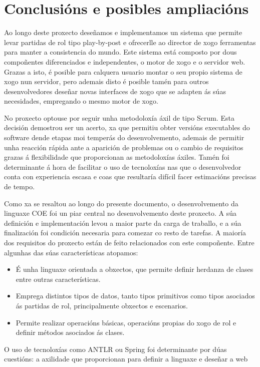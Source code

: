 \chapter{Conclusións e posibles ampliacións}
Ao longo deste proxecto deseñamos e implementamos un sistema que permite levar
partidas de rol tipo play-by-post e ofrecerlle ao director de xogo ferramentas
para manter a consistencia do mundo. Este sistema está composto por dous
compoñentes diferenciados e independentes, o motor de xogo e o servidor web.
Grazas a isto, é posible para calquera usuario montar o seu propio sistema de
xogo nun servidor, pero ademais disto é posible tamén para outros
desenvolvedores deseñar novas interfaces de xogo que se adapten ás súas
necesidades, empregando o mesmo motor de xogo.
\par
No proxecto optouse por seguir unha metodoloxía áxil de tipo Scrum. Esta
decisión demostrou ser un acerto, xa que  permitiu obter versións executables do
software dende etapas moi temperás do desenvolvemento, ademais de permitir unha
reacción rápida ante a aparición de problemas ou o cambio de requisitos grazas
á flexibilidade que proporcionan as metodoloxías áxiles. Tamén foi determinante
á hora de facilitar o uso de tecnoloxías nas que o desenvolvedor conta con
experiencia escasa e coas que resultaría difícil facer estimacións precisas de
tempo.
\par
Como xa se resaltou ao longo do presente documento, o desenvolvemento da
linguaxe COE foi un piar central no desenvolvemento deste proxecto. A súa
definición e implementación levou a maior parte da carga de traballo, e a súa
finalización foi condición necesaria para comezar co resto de tarefas. A maioría
dos requisitos do proxecto están de feito relacionados con este compoñente.
Entre algunhas das súas características atopamos:
\begin{itemize}
  \item É unha linguaxe orientada a obxectos, que permite definir herdanza de
  clases entre outras características.
  \item Emprega distintos tipos de datos, tanto tipos primitivos como tipos
  asociados ás partidas de rol, principalmente obxectos e escenarios.
  \item Permite realizar operacións básicas, operacións propias do xogo de rol e
  definir métodos asociados ás clases.
\end{itemize}
\par
O uso de tecnoloxías como ANTLR ou Spring foi determinante por dúas cuestións: a
axilidade que proporcionan para definir a linguaxe e deseñar a web
